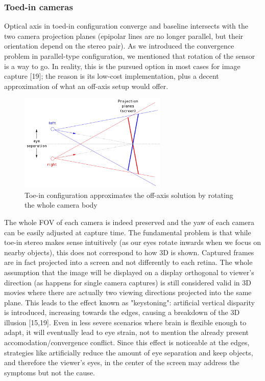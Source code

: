 \subsubsection{Toed-in cameras}
Optical axis in toed-in configuration converge and baseline intersects with the two camera projection planes (epipolar lines are no longer parallel, but their orientation depend on the stereo pair). As we introduced the convergence problem in parallel-type configuration, we mentioned that rotation of the sensor is a way to go. In reality, this is the pursued option in most cases for image capture [19]; the reason is its low-cost implementation, plus a decent approximation of what an off-axis setup would offer.
\begin{figure}
\centering
\includegraphics[width=7cm]{schemas/toein}
\caption{Toe-in configuration approximates the off-axis solution by rotating the whole camera body}
\label{fig:toedin_cameras}
\end{figure}
The whole FOV of each camera is indeed preserved and the yaw of each camera can be easily adjusted at capture time. The fundamental problem is that while toe-in stereo makes sense intuitively (as our eyes rotate inwards when we focus on nearby objects), this does not correspond to how 3D is shown. Captured frames are in fact projected into a screen and not differently to each retina. The whole assumption that the image will be displayed on a display orthogonal to viewer's direction (as happens for single camera captures) is still considered valid in 3D movies where there are actually two viewing directions projected into the same plane. This leads to the effect known as "keystoning": artificial vertical disparity is introduced, increasing towards the edges, causing a breakdown of the 3D illusion [15,19]. Even in less severe scenarios where brain is flexible enough to adapt, it will eventually lead to eye strain, not to mention the already present accomodation/convergence conflict. Since this effect is noticeable at the edges, strategies like artificially reduce the amount of eye separation and keep objects, and therefore the viewer's eyes, in the center of the screen may address the symptoms but not the cause.

